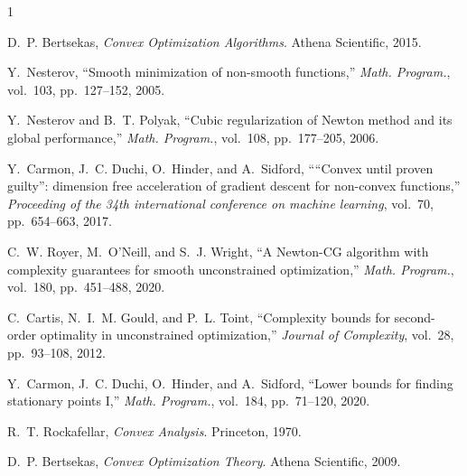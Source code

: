 \documentclass[12pt]{article}
\begin{document}
\begin{thebibliography}{1}

D.~P. Bertsekas, {\em Convex Optimization Algorithms}.
\newblock Athena Scientific, 2015.

Y.~Nesterov, ``Smooth minimization of non-smooth functions,'' {\em Math. Program.}, vol.~103, pp.~127--152, 2005.

Y.~Nesterov and B.~T. Polyak, ``Cubic regularization of {N}ewton method and its global performance,'' {\em Math. Program.}, vol.~108, pp.~177--205, 2006.

Y.~Carmon, J.~C. Duchi, O.~Hinder, and A.~Sidford, ````{C}onvex until proven guilty'': dimension free acceleration of gradient descent for non-convex functions,'' {\em Proceeding of the 34th international conference on machine learning}, vol.~70, pp.~654--663, 2017.

C.~W. Royer, M.~O’Neill, and S.~J. Wright, ``A {N}ewton-{CG} algorithm with complexity guarantees for smooth unconstrained optimization,'' {\em Math. Program.}, vol.~180, pp.~451--488, 2020.

C.~Cartis, N.~I.~M. Gould, and P.~L. Toint, ``Complexity bounds for second-order optimality in unconstrained optimization,'' {\em Journal of Complexity}, vol.~28, pp.~93--108, 2012.

Y.~Carmon, J.~C. Duchi, O.~Hinder, and A.~Sidford, ``Lower bounds for finding stationary points {I},'' {\em Math. Program.}, vol.~184, pp.~71--120, 2020.

R.~T. Rockafellar, {\em Convex Analysis}.
\newblock Princeton, 1970.

D.~P. Bertsekas, {\em Convex Optimization Theory}.
\newblock Athena Scientific, 2009.

\end{thebibliography}
\end{document}

